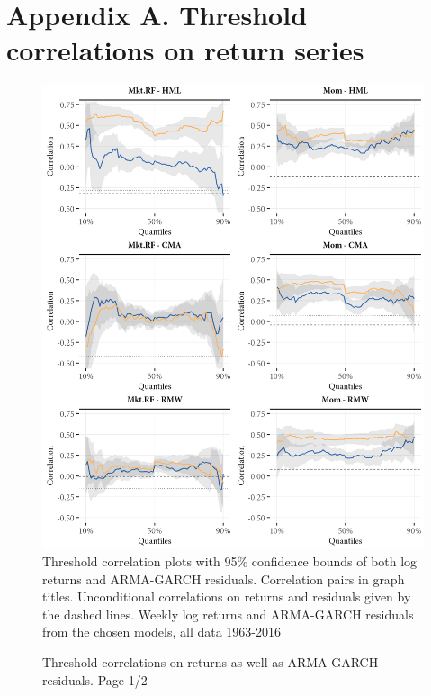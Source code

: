 \appendix
\appendixpageoff
\section{Appendix A. Threshold correlations on return series}
\label{app:threshold_return}
\begin{figure}[H]
  \caption{Threshold correlations on returns as well as ARMA-GARCH residuals. Page 1/2}
  \label{fig:appendix_threshold1}
  \centering
  \begin{minipage}{\textwidth}
  \includegraphics[scale=1]{graphics/appendix_threshold1.png}  
  \vspace{3mm}
  \footnotesize
  Threshold correlation plots with 95\% confidence bounds of both log returns and ARMA-GARCH residuals. Correlation pairs in graph titles. Unconditional correlations on returns and residuals given by the dashed lines. Weekly log returns and ARMA-GARCH residuals from the chosen models, all data 1963-2016
  \end{minipage}
\end{figure}
